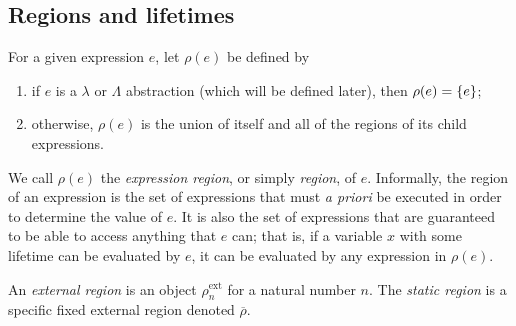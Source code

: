 \documentclass[11pt]{book}
\newcommand{\lstatic}{\ensuremath{\overline\rho}}
\begin{document}
\subsection{Regions and lifetimes}

\begin{defn}
  For a given expression \( e \), let \( \rho(e) \) be defined by
  \begin{enumerate}
    \item if \( e \) is a \( \lambda \) or \( \Lambda \) abstraction (which will be defined later), then \( \rho(e) = \qty{e} \);
    \item otherwise, \( \rho(e) \) is the union of itself and all of the regions of its child expressions.
  \end{enumerate}
  We call \( \rho(e) \) the \textit{expression region}, or simply \textit{region}, of \( e \).
  Informally, the region of an expression is the set of expressions that must \textit{a priori} be executed in order to determine the value of \( e \).
  It is also the set of expressions that are guaranteed to be able to access anything that \( e \) can; that is, if a variable \( x \) with some lifetime can be evaluated by \( e \), it can be evaluated by any expression in \( \rho(e) \).
\end{defn}
\begin{defn}
  An \textit{external region} is an object \( \rho_n^{\mathrm{ext}} \) for a natural number \( n \).
  The \textit{static region} is a specific fixed external region denoted \( \lstatic \).
\end{defn}
\end{document}
